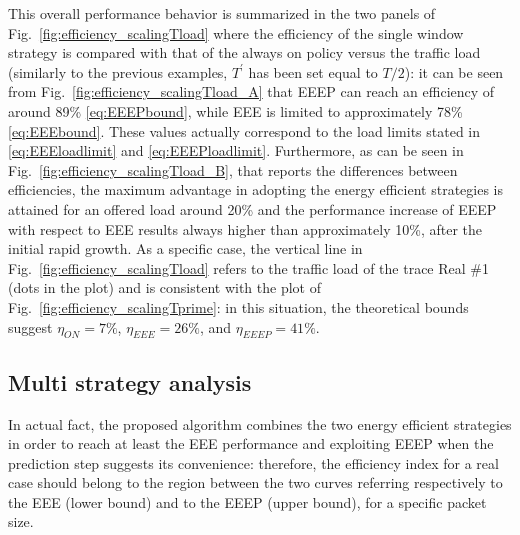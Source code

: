 \documentclass[journal,10pt,twoside,final]{IEEEtran}
\begin{document}
This overall performance behavior is summarized in the two panels of Fig.~\ref{fig:efficiency_scalingTload} where the efficiency of the single window strategy is compared with that of the always on policy versus the traffic load (similarly to the previous examples, $T^\prime$ has been set equal to $T/2$): it can be seen from Fig.~\ref{fig:efficiency_scalingTload_A} that EEEP can reach an efficiency of around 89\% \eqref{eq:EEEPbound}, while EEE is limited to approximately 78\% \eqref{eq:EEEbound}.
These values actually correspond to the load limits stated in \eqref{eq:EEEloadlimit} and \eqref{eq:EEEPloadlimit}.
Furthermore, as can be seen in Fig.~\ref{fig:efficiency_scalingTload_B}, that reports the differences between efficiencies, the maximum advantage in adopting the energy efficient strategies is attained for an offered load around 20\% and the performance increase of EEEP with respect to EEE results always higher than approximately 10\%, after the initial rapid growth. As a specific case, the vertical line in Fig.~\ref{fig:efficiency_scalingTload} refers to the traffic load of the trace Real \#1 (dots in the plot) and is consistent with the plot of Fig.~\ref{fig:efficiency_scalingTprime}: in this situation, the theoretical bounds suggest $\eta_{ON}=7\%$, $\eta_{EEE}=26\%$, and $\eta_{EEEP}=41\%$. 
\begin{figure*}[ht!]
\centering
{}
\hspace{1cm}
\vspace{-0.0cm}
\caption{Efficiency comparison of single strategies. The plots are shown as a function of the network load. The two dashed lines refer to the single EEE and EEEP strategies, whereas the solid line corresponds to the Always-On policy. The vertical gray line refers specifically to the trace Real \#1.}
\label{fig:efficiency_scalingTload}
\end{figure*}

\subsection{Multi strategy analysis}


In actual fact, the proposed algorithm combines the two energy efficient strategies in order to reach at least the EEE performance and exploiting EEEP when the prediction step suggests its convenience: therefore, the efficiency index for a real case should belong to the region between the two curves referring respectively to the EEE (lower bound) and to the EEEP (upper bound), for a specific packet size. 
\end{document}
